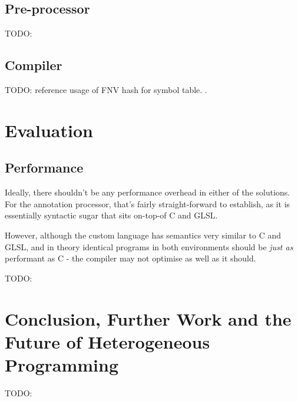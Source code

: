 \documentclass[a4paper,12pt,twoside,openright]{report}
\begin{document}
\section{Pre-processor}

TODO:

\section{Compiler}

TODO: reference usage of FNV hash for symbol table. \cite{FNVHash}.


\chapter{Evaluation}



\section{Performance}

Ideally, there shouldn't be any performance overhead in either of the
solutions. For the annotation processor, that's fairly straight-forward to
establish, as it is essentially syntactic sugar that sits on-top-of C and GLSL.

However, although the custom language has semantics very similar to C and GLSL,
and in theory identical programs in both environments should be \textit{just
as} performant as C - the compiler may not optimise as well as it should.

TODO:


\chapter{Conclusion, Further Work and the Future of Heterogeneous Programming}



TODO:

\appendix
\singlespacing



\end{document}
